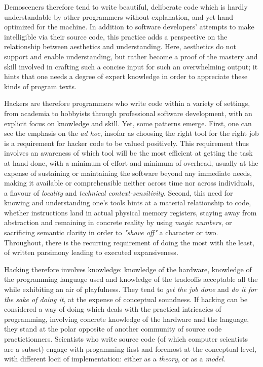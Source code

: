 Demosceners therefore tend to write beautiful, deliberate code which is hardly understandable by other programmers without explanation, and yet hand-optimized for the machine. In addition to software developers' attempts to make intelligible via their source code, this practice adds a perspective on the relationship between aesthetics and understanding. Here, aesthetics do not support and enable understanding, but rather become a proof of the mastery and skill involved in crafting such a concise input for such an overwhelming output; it hints that one needs a degree of expert knowledge in order to appreciate these kinds of program texts.

Hackers are therefore programmers who write code within a variety of settings, from academia to hobbyists through professional software development, with an explicit focus on knowledge and skill. Yet, some patterns emerge. First, one can see the emphasis on the \emph{ad hoc}, insofar as choosing the right tool for the right job is a requirement for hacker code to be valued positively. This requirement thus involves an awareness of which tool will be the most efficient at getting the task at hand done, with a minimum of effort and minimum of overhead, usually at the expense of sustaining or maintaining the software beyond any immediate needs, making it available or comprehensible neither across time nor across individuals, a flavour of \emph{locality} and \emph{technical context-sensitivity}. Second, this need for knowing and understanding one's tools hints at a material relationship to code, whether instructions land in actual physical memory registers, staying away from abstraction and remaining in concrete reality by using \emph{magic numbers}, or sacrificing semantic clarity in order to \emph{"shave off"} a character or two. Throughout, there is the recurring requirement of doing the most with the least, of written parsimony leading to executed expansiveness.

Hacking therefore involves knowledge: knowledge of the hardware, knowledge of the programming language used and knowledge of the tradeoffs acceptable all the while exhibiting an air of playfulness. They tend to \emph{get the job done} and \emph{do it for the sake of doing it}, at the expense of conceptual soundness. If hacking can be considered a way of doing which deals with the practical intricacies of programming, involving concrete knowledge of the hardware and the language, they stand at the polar opposite of another community of source code practictionners. Scientists who write source code (of which computer scientists are a subset) engage with progamming first and foremost at the conceptual level, with different locii of implementation: either as a \emph{theory}, or as a \emph{model}.

